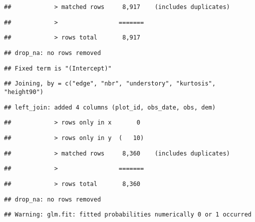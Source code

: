 \documentclass[
]{article}
\begin{document}
\begin{verbatim}
##            > matched rows     8,917    (includes duplicates)
\end{verbatim}

\begin{verbatim}
##            >                 =======
\end{verbatim}

\begin{verbatim}
##            > rows total       8,917
\end{verbatim}

\begin{verbatim}
## drop_na: no rows removed
\end{verbatim}

\begin{verbatim}
## Fixed term is "(Intercept)"
\end{verbatim}

\begin{verbatim}
## Joining, by = c("edge", "nbr", "understory", "kurtosis", "height90")
\end{verbatim}

\begin{verbatim}
## left_join: added 4 columns (plot_id, obs_date, obs, dem)
\end{verbatim}

\begin{verbatim}
##            > rows only in x       0
\end{verbatim}

\begin{verbatim}
##            > rows only in y  (   10)
\end{verbatim}

\begin{verbatim}
##            > matched rows     8,360    (includes duplicates)
\end{verbatim}

\begin{verbatim}
##            >                 =======
\end{verbatim}

\begin{verbatim}
##            > rows total       8,360
\end{verbatim}

\begin{verbatim}
## drop_na: no rows removed
\end{verbatim}

\begin{verbatim}
## Warning: glm.fit: fitted probabilities numerically 0 or 1 occurred
\end{verbatim}
\end{document}
